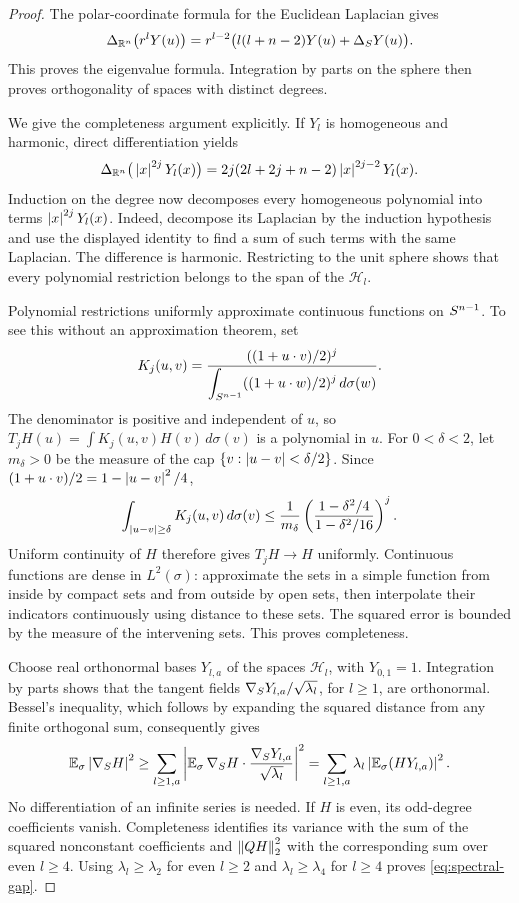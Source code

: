 \begin{proof}
The polar-coordinate formula for the Euclidean Laplacian gives
\[
 \Delta_{\mathbb R^n}\big(r^lY(u)\big)
 =r^{l-2}\big(l(l+n-2)Y(u)+\Delta_S Y(u)\big).
\]
This proves the eigenvalue formula.  Integration by parts on the sphere
then proves orthogonality of spaces with distinct degrees.

We give the completeness argument explicitly.  If $Y_l$ is homogeneous
and harmonic, direct differentiation yields
\[
 \Delta_{\mathbb R^n}\big(\left|x\right|^{2j}Y_l(x)\big)
 =2j(2l+2j+n-2)\left|x\right|^{2j-2}Y_l(x).
\]
Induction on the degree now decomposes every homogeneous polynomial
into terms $\left|x\right|^{2j}Y_l(x)$.  Indeed, decompose its Laplacian by the
induction hypothesis and use the displayed identity to find a sum of
such terms with the same Laplacian.  The difference is harmonic.
Restricting to the unit sphere shows that every polynomial restriction
belongs to the span of the $\mathcal H_l$.

Polynomial restrictions uniformly approximate continuous functions on
$S^{n-1}$.  To see this without an approximation theorem, set
\[
 K_j(u,v)=
 \frac{((1+u\cdot v)/2)^j}
 {\displaystyle\int_{S^{n-1}}((1+u\cdot w)/2)^j\,d\sigma(w)}.
\]
The denominator is positive and independent of $u$, so
$T_jH(u)=\int K_j(u,v)H(v)\,d\sigma(v)$ is a polynomial in $u$.
For $0<\delta<2$, let $m_\delta>0$ be the measure of the cap
$\{v:\left|u-v\right|<\delta/2\}$.  Since
$(1+u\cdot v)/2=1-\left|u-v\right|^2/4$,
\[
 \int_{\left|u-v\right|\ge\delta}K_j(u,v)\,d\sigma(v)
 \le \frac1{m_\delta}
 \left(\frac{1-\delta^2/4}{1-\delta^2/16}\right)^j.
\]
Uniform continuity of $H$ therefore gives $T_jH\to H$ uniformly.
Continuous functions are dense in $L^2(\sigma)$: approximate the sets
in a simple function from inside by compact sets and from outside by
open sets, then interpolate their indicators continuously using
distance to these sets.  The squared error is bounded by the measure
of the intervening sets.  This proves completeness.

Choose real orthonormal bases $Y_{l,a}$ of the spaces $\mathcal H_l$,
with $Y_{0,1}=1$.  Integration by parts shows that the tangent fields
$\nabla_S Y_{l,a}/\sqrt{\lambda_l}$, for $l\ge1$, are orthonormal.
Bessel's inequality, which follows by expanding the squared distance
from any finite orthogonal sum, consequently gives
\[
 \mathbb E_{\sigma}\left|\nabla_S H\right|^2
 \ge \sum_{l\ge1,a}
 \left|\mathbb E_{\sigma}\,\nabla_S H\cdot
       \frac{\nabla_S Y_{l,a}}{\sqrt{\lambda_l}}\right|^2
 =\sum_{l\ge1,a}\lambda_l\left|\mathbb E_{\sigma}(HY_{l,a})\right|^2.
\]
No differentiation of an infinite series is needed.  If $H$ is even,
its odd-degree coefficients vanish.  Completeness identifies its
variance with the sum of the squared nonconstant coefficients and
$\left\lVert QH\right\rVert_2^2$ with the corresponding sum over even $l\ge4$.
Using $\lambda_l\ge\lambda_2$ for even $l\ge2$ and
$\lambda_l\ge\lambda_4$ for $l\ge4$ proves
\eqref{eq:spectral-gap}.
\end{proof}

